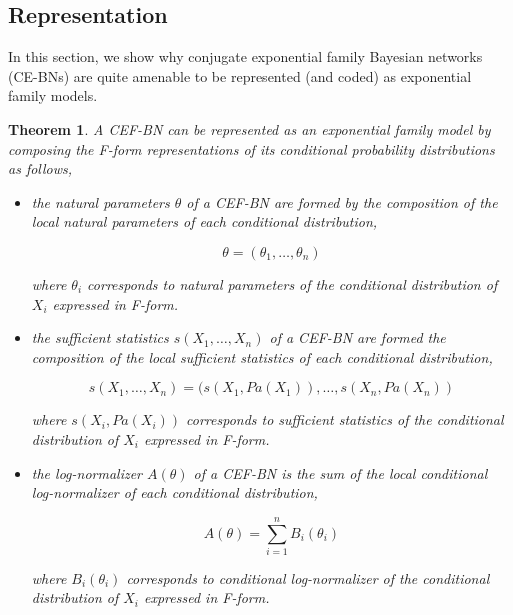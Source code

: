 \documentclass[11pt, oneside]{article}   	%
\newtheorem{theorem}{Theorem}
\numberwithin{figure}{section}
\numberwithin{equation}{section}
\numberwithin{table}{section}
\theoremstyle{definition}
\begin{document}
\subsection{Representation} \label{Section:CEFBN:Representation}

In this section, we show why conjugate exponential family Bayesian networks (CE-BNs) are quite amenable to be represented (and coded) as exponential family models. 

\begin{theorem}
A CEF-BN can be represented as an exponential family model by composing the F-form representations of its conditional probability distributions as follows, 

\begin{itemize}
\item the natural parameters  $\theta$ of a CEF-BN are formed by the composition of the local natural parameters of each conditional distribution, 

$$\theta = (\theta_1, \ldots, \theta_n)$$

\noindent where $\theta_i$ corresponds to natural parameters of the conditional distribution of $X_i$ expressed in F-form.

\item the sufficient statistics $s(X_1,\ldots,X_n)$ of a CEF-BN are formed the composition of the local sufficient statistics of each conditional distribution, 

$$s(X_1,\ldots,X_n) = (s(X_1,Pa(X_1)), \ldots, s(X_n,Pa(X_n))$$

\noindent where $s(X_i,Pa(X_i))$ corresponds to sufficient statistics of the conditional distribution of $X_i$ expressed in F-form.

\item the log-normalizer $A(\theta)$ of a CEF-BN is the sum of the local conditional log-normalizer of each conditional distribution,


$$ A(\theta) = \sum_{i=1}^n B_i(\theta_i) $$

\noindent where $B_i(\theta_i)$ corresponds to \textit{conditional log-normalizer} of the conditional distribution of $X_i$ expressed in F-form.

\end{itemize}

\end{theorem}
\end{document}
